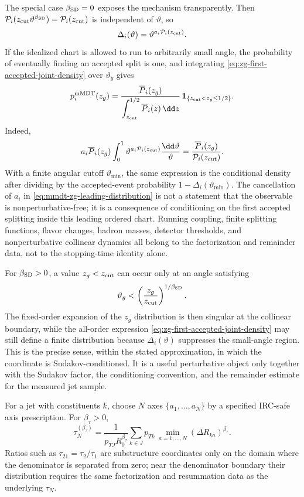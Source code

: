 The special case \(\beta_{\rm SD}=0\) exposes the mechanism transparently.
Then \(\mathcal P_i(z_{\rm cut}\vartheta^{\beta_{\rm SD}})
=\mathcal P_i(z_{\rm cut})\) is independent of \(\vartheta\), so
\[
  \Delta_i(\vartheta)=
  \vartheta^{a_i\mathcal P_i(z_{\rm cut})}.
\]
If the idealized chart is allowed to run to arbitrarily small angle, the
probability of eventually finding an accepted split is one, and integrating
\eqref{eq:zg-first-accepted-joint-density} over \(\vartheta_g\) gives
\begin{equation}
  p_i^{\rm mMDT}(z_g)
  =
  \frac{\overline P_i(z_g)}
       {\displaystyle\int_{z_{\rm cut}}^{1/2}
        \overline P_i(z)\,\dd z}\,
  \mathbf 1_{\{z_{\rm cut}<z_g\leq1/2\}} .
  \label{eq:mmdt-zg-leading-distribution}
\end{equation}
Indeed,
\[
  a_i\overline P_i(z_g)
  \int_0^1
  \vartheta^{a_i\mathcal P_i(z_{\rm cut})}
  \frac{\dd\vartheta}{\vartheta}
  =
  \frac{\overline P_i(z_g)}{\mathcal P_i(z_{\rm cut})}.
\]
With a finite angular cutoff \(\vartheta_{\min}\), the same expression is the
conditional density after dividing by the accepted-event probability
\(1-\Delta_i(\vartheta_{\min})\).  The cancellation of \(a_i\) in
\eqref{eq:mmdt-zg-leading-distribution} is not a statement that the
observable is nonperturbative-free; it is a consequence of conditioning on the
first accepted splitting inside this leading ordered chart.  Running coupling,
finite splitting functions, flavor changes, hadron masses, detector
thresholds, and nonperturbative collinear dynamics all belong to the
factorization and remainder data, not to the stopping-time identity alone.

For \(\beta_{\rm SD}>0\), a value \(z_g<z_{\rm cut}\) can occur only at an
angle satisfying
\[
  \vartheta_g<\left(\frac{z_g}{z_{\rm cut}}\right)^{1/\beta_{\rm SD}} .
\]
The fixed-order expansion of the \(z_g\) distribution is then singular at the
collinear boundary, while the all-order expression
\eqref{eq:zg-first-accepted-joint-density} may still define a finite
distribution because \(\Delta_i(\vartheta)\) suppresses the small-angle
region.  This is the precise sense, within the stated approximation, in which
the coordinate is Sudakov-conditioned.  It is a useful perturbative object
only together with the Sudakov factor, the conditioning convention, and the
remainder estimate for the measured jet sample.

\begin{definition}[\(N\)-subjettiness]
\label{def:n-subjettiness}
For a jet with constituents \(k\), choose \(N\) axes
\(\{a_1,\ldots,a_N\}\) by a specified IRC-safe axis prescription.  For
\(\beta_\tau>0\),
\[
  \tau_N^{(\beta_\tau)}
  =
  \frac{1}{p_{TJ}R_0^{\beta_\tau}}
  \sum_{k\in J}p_{Tk}\,
  \min_{a=1,\ldots,N}(\Delta R_{ka})^{\beta_\tau}.
\]
Ratios such as \(\tau_{21}=\tau_2/\tau_1\) are substructure coordinates only
on the domain where the denominator is separated from zero; near the
denominator boundary their distribution requires the same factorization and
resummation data as the underlying \(\tau_N\).
\end{definition}

